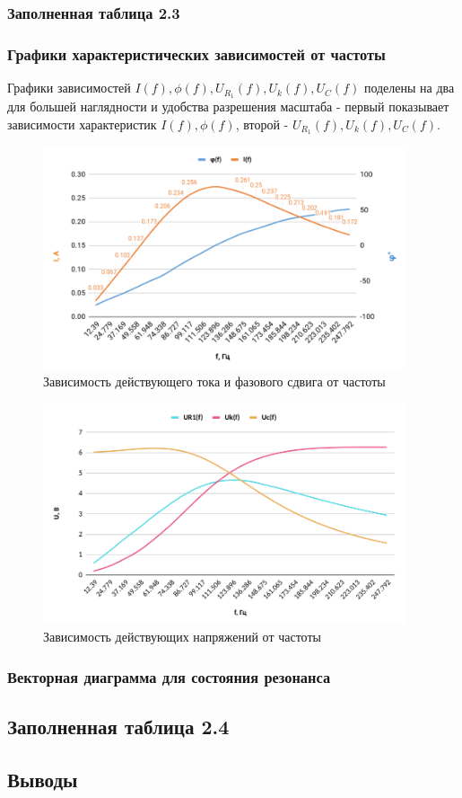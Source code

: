 \subsubsection{Заполненная таблица 2.3}


\subsubsection{Графики характеристических зависимостей от частоты}

Графики зависимостей $I(f), \phi(f), U_{R_1} (f), U_k (f), U_C (f)$ поделены на два для большей наглядности и удобства разрешения масштаба - первый показывает зависимости характеристик $I(f), \phi(f)$, второй - $U_{R_1} (f), U_k (f), U_C (f)$.

\begin{figure}[H]
	\centering
	\includegraphics[width=0.95\textwidth]{./data/graph_part2_1.png}
	\caption{Зависимость действующего тока и фазового сдвига от частоты}
\end{figure}

\begin{figure}[H]
	\centering
	\includegraphics[width=0.95\textwidth]{./data/graph_part2_2.png}
	\caption{Зависимость действующих напряжений от частоты}
\end{figure}


\subsubsection{Векторная диаграмма для состояния резонанса}



\subsection{Заполненная таблица 2.4}

\subsection{Выводы}
